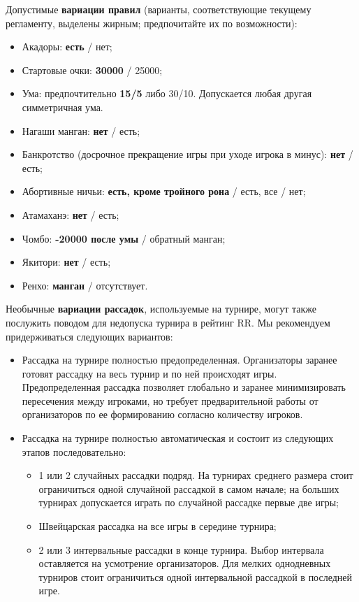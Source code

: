 Допустимые \textbf{вариации правил} (варианты, соответствующие текущему регламенту, выделены жирным; предпочитайте их по возможности):
\begin{itemize}
	\item Акадоры: \textbf{есть} / нет;
	\item Стартовые очки: \textbf{30000} / 25000;
	\item Ума: предпочтительно \textbf{15/5} либо 30/10. Допускается любая другая симметричная ума.
	\item Нагаши манган: \textbf{нет} / есть;
	\item Банкротство (досрочное прекращение игры при уходе игрока в минус): \textbf{нет} / есть;
	\item Абортивные ничьи: \textbf{есть, кроме тройного рона} / есть, все / нет;
	\item Атамаханэ: \textbf{нет} / есть;
	\item Чомбо: \textbf{-20000 после умы} / обратный манган;
	\item Якитори: \textbf{нет} / есть;
	\item Ренхо: \textbf{манган} / отсутствует.
\end{itemize}

Необычные \textbf{вариации рассадок}, используемые на турнире, могут также послужить поводом для недопуска турнира в рейтинг RR. Мы рекомендуем придерживаться следующих вариантов:
\begin{itemize}
	\item Рассадка на турнире полностью предопределенная. Организаторы заранее готовят рассадку на весь турнир и по ней происходят игры. Предопределенная рассадка позволяет глобально и заранее минимизировать пересечения между игроками, но требует предварительной работы от организаторов по ее формированию согласно количеству игроков.
	\item Рассадка на турнире полностью автоматическая и состоит из следующих этапов последовательно:
	\begin{itemize}
		\item 1 или 2 случайных рассадки подряд. На турнирах среднего размера стоит ограничиться одной случайной рассадкой в самом начале; на больших турнирах допускается играть по случайной рассадке первые две игры;
		\item Швейцарская рассадка на все игры в середине турнира;
		\item 2 или 3 интервальные рассадки в конце турнира. Выбор интервала оставляется на усмотрение организаторов. Для мелких однодневных турниров стоит ограничиться одной интервальной рассадкой в последней игре.
	\end{itemize}
\end{itemize}

